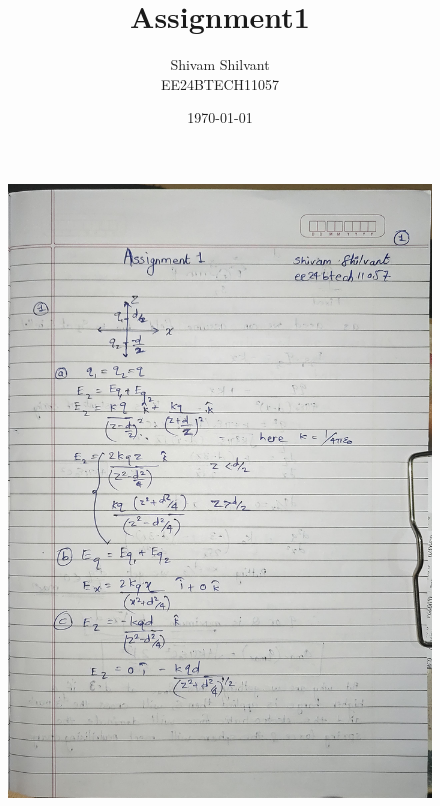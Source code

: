 \documentclass{article}
\title{Assignment1}
\author{Shivam Shilvant\\EE24BTECH11057}
\date{\today}
\begin{document}
\maketitle
\begin{figure}[H]
    \centering
    \includegraphics[width=\textwidth]{figs/written/1.jpg}
\end{figure}
\end{document}
